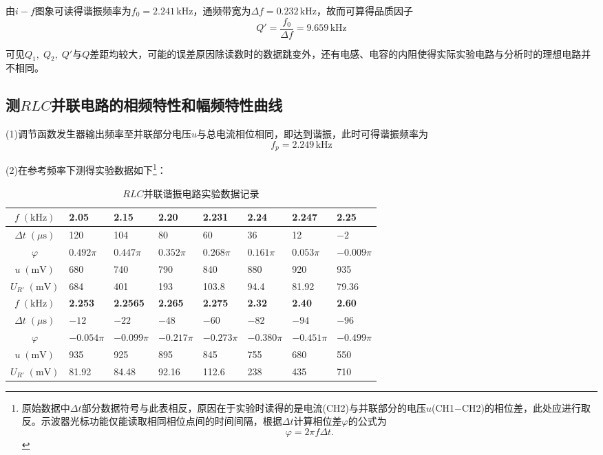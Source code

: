 \documentclass[UTF-8,twoside,cs4size]{ctexart}
\begin{document}
	由$ i-f $图象可读得谐振频率为$ f_0=2.241\,\mathrm{kHz} $，通频带宽为$ \Delta f=0.232\,\mathrm{kHz} $，故而可算得品质因子
	\[Q'=\frac{f_0}{\Delta f}=9.659\,\mathrm{kHz}\]
	
	可见$ Q_1,\;Q_2,\;Q' $与$ Q $差距均较大，可能的误差原因除读数时的数据跳变外，还有电感、电容的内阻使得实际实验电路与分析时的理想电路并不相同。
	
	\subsection{测$ RLC $并联电路的相频特性和幅频特性曲线}
	
	(1)调节函数发生器输出频率至并联部分电压$ u $与总电流相位相同，即达到谐振，此时可得谐振频率为
	\[f_p=2.249\,\mathrm{kHz}\]
	
	(2)在参考频率下测得实验数据如下\footnote{原始数据中$ \Delta t $部分数据符号与此表相反，原因在于实验时读得的是电流(CH2)与并联部分的电压$ u $(CH1$ - $CH2)的相位差，此处应进行取反。示波器光标功能仅能读取相同相位点间的时间间隔，根据$ \Delta t $计算相位差$ \varphi $的公式为
		\[\varphi=2\pi f\Delta t.\]}：
	\begin{table}[!h]		
		\centering
		\renewcommand\arraystretch{1.5}
		\caption{$ RLC $并联谐振电路实验数据记录}
		\begin{tabularx}{\textwidth}{|c|Y|Y|Y|Y|Y|Y|Y|}
			\hline
			$ f\;(\mathrm{kHz}) $&\textbf{2.05}&\textbf{2.15}&\textbf{2.20}&\textbf{2.231}&\textbf{2.24}&\textbf{2.247}&\textbf{2.25}\\
			\hline
			$ \Delta t\;(\mu\mathrm s) $&120&104&80&60&36&12&$ -2 $\\
			\hline
			$ \varphi $&$ 0.492\pi $&$ 0.447\pi $&$ 0.352\pi $&$ 0.268\pi $&$ 0.161\pi $&$ 0.053\pi $&$ -0.009\pi $\\
			\hline
			$ u\;(\mathrm{mV}) $&680&740&790&840&880&920&935\\
			\hline
			$ U_{R'}\;(\mathrm{mV}) $&684&401&193&103.8&94.4&81.92&79.36\\
			\hline
			$ f\;(\mathrm{kHz}) $&\textbf{2.253}&\textbf{2.2565}&\textbf{2.265}&\textbf{2.275}&\textbf{2.32}&\textbf{2.40}&\textbf{2.60}\\
			\hline
			$ \Delta t\;(\mu\mathrm s) $&$ -12 $&$ -22 $&$ -48 $&$ -60 $&$ -82 $&$ -94 $&$ -96 $\\
			\hline
			$ \varphi $&$ -0.054\pi $&$ -0.099\pi $&$ -0.217\pi $&$ -0.273\pi $&$ -0.380\pi $&$ -0.451\pi $&$ -0.499\pi $\\
			\hline
			$ u\;(\mathrm{mV}) $&935&925&895&845&755&680&550\\
			\hline
			$ U_{R'}\;(\mathrm{mV}) $&81.92&84.48&92.16&112.6&238&435&710\\
			\hline			
		\end{tabularx}
	\end{table}
	
\end{document}
